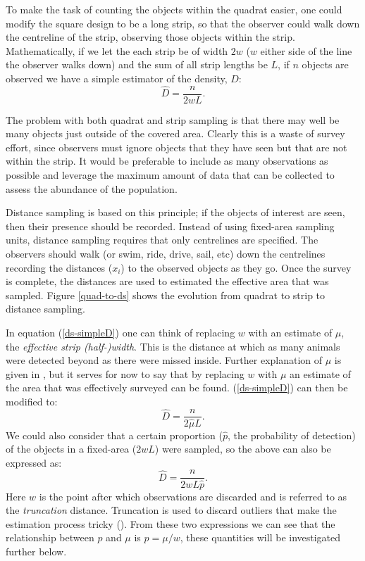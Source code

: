 To make the task of counting the objects within the quadrat easier, one could modify the square design to be a long strip, so that the observer could walk down the centreline of the strip, observing those objects within the strip. Mathematically, if we let the each strip be of width $2w$ ($w$ either side of the line the observer walks down) and the sum of all strip lengths be $L$, if $n$ objects are observed we have a simple estimator of the density, $D$:
\begin{equation}
\hat{D}=\frac{n}{2wL}.
\label{ds-simpleD}
\end{equation}

The problem with both quadrat and strip sampling is that there may well be many objects just outside of the covered area. Clearly this is a waste of survey effort, since observers must ignore objects that they have seen but that are not within the strip. It would be preferable to include as many observations as possible and leverage the maximum amount of data that can be collected to assess the abundance of the population.

Distance sampling is based on this principle; if the objects of interest are seen, then their presence should be recorded. Instead of using fixed-area sampling units, distance sampling requires that only centrelines are specified. The observers should walk (or swim, ride, drive, sail, etc) down the centrelines recording the distances ($x_i$) to the observed objects as they go. Once the survey is complete, the distances are used to estimated the effective area that was sampled. Figure \ref{quad-to-ds} shows the evolution from quadrat to strip to distance sampling.

In equation (\ref{ds-simpleD}) one can think of replacing $w$ with an estimate of $\mu$, the \textit{effective strip (half-)width}. This is the distance at which as many animals were detected beyond as there were missed inside. Further explanation of $\mu$ is given in , but it serves for now to say that by replacing $w$ with $\mu$ an estimate of the area that was effectively surveyed can be found. (\ref{ds-simpleD}) can then be modified to:
\begin{equation}
\hat{D}=\frac{n}{2\hat{\mu}L}.
\label{ds-D}
\end{equation}
We could also consider that a certain proportion ($\hat{p}$, the probability of detection) of the objects in a fixed-area ($2wL$) were sampled, so the above can also be expressed as:
\begin{equation*}
\hat{D}=\frac{n}{2wL\hat{p}}.
\end{equation*}
Here $w$ is the point after which observations are discarded and is referred to as the \textit{truncation} distance. Truncation is used to discard outliers that make the estimation process tricky (\cite[pp. 15-16]{IDS}). From these two expressions we can see that the relationship between $p$ and $\mu$ is $p=\mu/w$, these quantities will be investigated further below.

